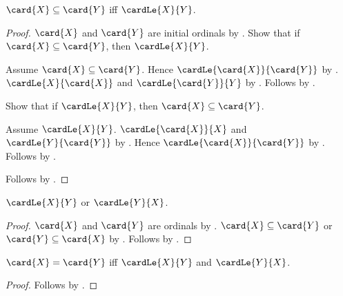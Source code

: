 \begin{theorem}\label{card_subseteq_iff_cardinal_le}
    $\card{X}\subseteq\card{Y}$ iff $\cardLe{X}{Y}$.
\end{theorem}
\begin{proof}
    $\card{X}$ and $\card{Y}$ are initial ordinals
        by .
    Show that if $\card{X}\subseteq\card{Y}$, then
        $\cardLe{X}{Y}$.
    \begin{subproof}
        Assume $\card{X}\subseteq\card{Y}$.
        Hence $\cardLe{\card{X}}{\card{Y}}$
            by .
        $\cardLe{X}{\card{X}}$ and
            $\cardLe{\card{Y}}{Y}$
            by
            .
        Follows by .
    \end{subproof}
    Show that if $\cardLe{X}{Y}$, then
        $\card{X}\subseteq\card{Y}$.
    \begin{subproof}
        Assume $\cardLe{X}{Y}$.
        $\cardLe{\card{X}}{X}$ and
            $\cardLe{Y}{\card{Y}}$
            by
            .
        Hence $\cardLe{\card{X}}{\card{Y}}$
            by .
        Follows by .
    \end{subproof}
    Follows by \auto.
\end{proof}

\begin{theorem}\label{cardinal_comparability}
    $\cardLe{X}{Y}$ or $\cardLe{Y}{X}$.
\end{theorem}
\begin{proof}
    $\card{X}$ and $\card{Y}$ are ordinals by .
    $\card{X}\subseteq\card{Y}$ or
        $\card{Y}\subseteq\card{X}$
        by .
    Follows by .
\end{proof}

\begin{theorem}\label{card_eq_iff_mutual_cardinal_le}
    $\card{X}=\card{Y}$ iff
        $\cardLe{X}{Y}$ and $\cardLe{Y}{X}$.
\end{theorem}
\begin{proof}
    Follows by
        .
\end{proof}

